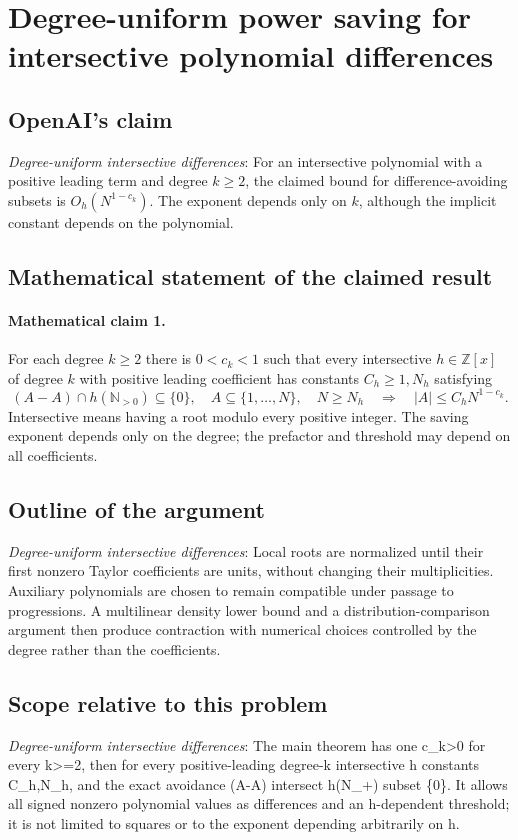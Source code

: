 \documentclass[11pt]{article}
\begin{document}
\section*{Degree-uniform power saving for intersective polynomial differences}

\subsection{OpenAI's claim}
\textit{Degree-uniform intersective differences}: For an intersective polynomial with a positive leading term and degree $k\ge2$, the claimed bound for difference-avoiding subsets is $O_h(N^{1-c_k})$. The exponent depends only on $k$, although the implicit constant depends on the polynomial.

\subsection{Mathematical statement of the claimed result}
\paragraph{Mathematical claim 1.} For each degree $k\ge2$ there is $0<c_k<1$ such that every intersective $h\in\mathbb Z[x]$ of degree $k$ with positive leading coefficient has constants $C_h\ge1,N_h$ satisfying \[(A-A)\cap h(\mathbb N_{>0})\subseteq\{0\},\quad A\subseteq\{1,\ldots,N\},\quad N\ge N_h\quad\Longrightarrow\quad|A|\le C_hN^{1-c_k}.\] Intersective means having a root modulo every positive integer. The saving exponent depends only on the degree; the prefactor and threshold may depend on all coefficients.

\subsection{Outline of the argument}
\textit{Degree-uniform intersective differences}: Local roots are normalized until their first nonzero Taylor coefficients are units, without changing their multiplicities. Auxiliary polynomials are chosen to remain compatible under passage to progressions. A multilinear density lower bound and a distribution-comparison argument then produce contraction with numerical choices controlled by the degree rather than the coefficients.

\subsection{Scope relative to this problem}
\textit{Degree-uniform intersective differences}: The main theorem has one c\_k>0 for every k>=2, then for every positive-leading degree-k intersective h constants C\_h,N\_h, and the exact avoidance (A-A) intersect h(N\_+) subset \{0\}. It allows all signed nonzero polynomial values as differences and an h-dependent threshold; it is not limited to squares or to the exponent depending arbitrarily on h.
\end{document}
